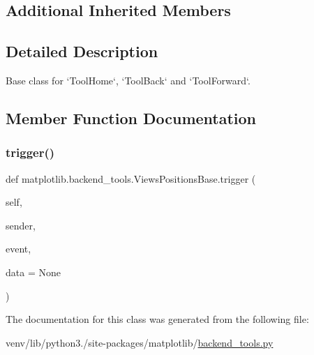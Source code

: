 \subsection*{Additional Inherited Members}


\subsection{Detailed Description}
\begin{DoxyVerb}Base class for `ToolHome`, `ToolBack` and `ToolForward`.\end{DoxyVerb}
 

\subsection{Member Function Documentation}
\mbox{\label{classmatplotlib_1_1backend__tools_1_1ViewsPositionsBase_abd774ce26501992ca64a6b34e6ff5455}} 
\subsubsection{\texorpdfstring{trigger()}{trigger()}}
{\footnotesize\ttfamily def matplotlib.\+backend\+\_\+tools.\+Views\+Positions\+Base.\+trigger (\begin{DoxyParamCaption}\item[{}]{self,  }\item[{}]{sender,  }\item[{}]{event,  }\item[{}]{data = {\ttfamily None} }\end{DoxyParamCaption})}



The documentation for this class was generated from the following file\+:\begin{DoxyCompactItemize}
\item 
venv/lib/python3./site-\/packages/matplotlib/\hyperlink{backend__tools_8py}{backend\+\_\+tools.\+py}\end{DoxyCompactItemize}
